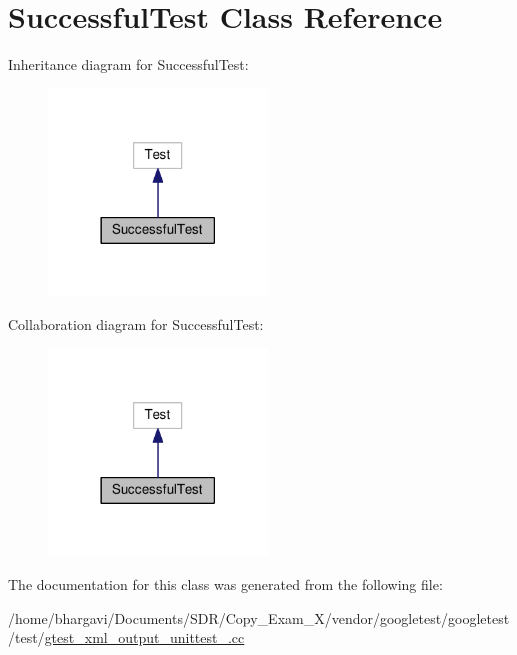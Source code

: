 \hypertarget{class_successful_test}{}\section{Successful\+Test Class Reference}
\label{class_successful_test}


Inheritance diagram for Successful\+Test\+:
\nopagebreak
\begin{figure}[H]
\begin{center}
\leavevmode
\includegraphics[width=165pt]{class_successful_test__inherit__graph}
\end{center}
\end{figure}


Collaboration diagram for Successful\+Test\+:
\nopagebreak
\begin{figure}[H]
\begin{center}
\leavevmode
\includegraphics[width=165pt]{class_successful_test__coll__graph}
\end{center}
\end{figure}


The documentation for this class was generated from the following file\+:\begin{DoxyCompactItemize}
\item 
/home/bhargavi/\+Documents/\+S\+D\+R/\+Copy\+\_\+\+Exam\+\_\+X/vendor/googletest/googletest/test/\hyperlink{gtest__xml__output__unittest___8cc}{gtest\+\_\+xml\+\_\+output\+\_\+unittest\+\_\+.\+cc}\end{DoxyCompactItemize}
